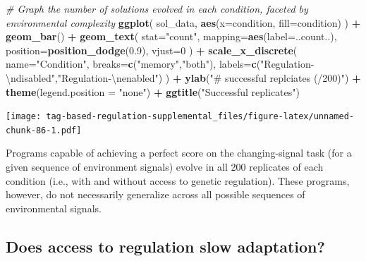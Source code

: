 \documentclass[
]{book}
\newenvironment{Shaded}{\begin{snugshade}}{\end{snugshade}}
\newcommand{\CharTok}[1]{\textcolor[rgb]{0.31,0.60,0.02}{#1}}
\newcommand{\CommentTok}[1]{\textcolor[rgb]{0.56,0.35,0.01}{\textit{#1}}}
\newcommand{\DataTypeTok}[1]{\textcolor[rgb]{0.13,0.29,0.53}{#1}}
\newcommand{\DecValTok}[1]{\textcolor[rgb]{0.00,0.00,0.81}{#1}}
\newcommand{\FloatTok}[1]{\textcolor[rgb]{0.00,0.00,0.81}{#1}}
\newcommand{\KeywordTok}[1]{\textcolor[rgb]{0.13,0.29,0.53}{\textbf{#1}}}
\newcommand{\NormalTok}[1]{#1}
\newcommand{\OperatorTok}[1]{\textcolor[rgb]{0.81,0.36,0.00}{\textbf{#1}}}
\newcommand{\StringTok}[1]{\textcolor[rgb]{0.31,0.60,0.02}{#1}}
\begin{document}
\begin{Shaded}
\begin{Highlighting}[]
\CommentTok{\# Graph the number of solutions evolved in each condition, faceted by environmental complexity}
\KeywordTok{ggplot}\NormalTok{( sol\_data, }\KeywordTok{aes}\NormalTok{(}\DataTypeTok{x=}\NormalTok{condition, }\DataTypeTok{fill=}\NormalTok{condition) ) }\OperatorTok{+}
\StringTok{  }\KeywordTok{geom\_bar}\NormalTok{() }\OperatorTok{+}
\StringTok{  }\KeywordTok{geom\_text}\NormalTok{(}
    \DataTypeTok{stat=}\StringTok{"count"}\NormalTok{,}
    \DataTypeTok{mapping=}\KeywordTok{aes}\NormalTok{(}\DataTypeTok{label=}\NormalTok{..count..),}
    \DataTypeTok{position=}\KeywordTok{position\_dodge}\NormalTok{(}\FloatTok{0.9}\NormalTok{),}
    \DataTypeTok{vjust=}\DecValTok{0}
\NormalTok{  ) }\OperatorTok{+}
\StringTok{  }\KeywordTok{scale\_x\_discrete}\NormalTok{(}
    \DataTypeTok{name=}\StringTok{"Condition"}\NormalTok{,}
    \DataTypeTok{breaks=}\KeywordTok{c}\NormalTok{(}\StringTok{"memory"}\NormalTok{,}\StringTok{"both"}\NormalTok{),}
    \DataTypeTok{labels=}\KeywordTok{c}\NormalTok{(}\StringTok{"Regulation{-}}\CharTok{\textbackslash{}n}\StringTok{disabled"}\NormalTok{,}\StringTok{"Regulation{-}}\CharTok{\textbackslash{}n}\StringTok{enabled"}\NormalTok{)}
\NormalTok{  ) }\OperatorTok{+}
\StringTok{  }\KeywordTok{ylab}\NormalTok{(}\StringTok{"\# successful replciates (/200)"}\NormalTok{) }\OperatorTok{+}
\StringTok{  }\KeywordTok{theme}\NormalTok{(}\DataTypeTok{legend.position =} \StringTok{"none"}\NormalTok{) }\OperatorTok{+}
\StringTok{  }\KeywordTok{ggtitle}\NormalTok{(}\StringTok{"Successful replicates"}\NormalTok{)}
\end{Highlighting}
\end{Shaded}

\texttt{[image: tag-based-regulation-supplemental\_files/figure-latex/unnamed-chunk-86-1.pdf]}

Programs capable of achieving a perfect score on the changing-signal task (for a given sequence of environment signals) evolve in all 200 replicates of each condition (i.e., with and without access to genetic regulation).
These programs, however, do not necessarily generalize across all possible sequences of environmental signals.

\hypertarget{does-access-to-regulation-slow-adaptation}{%
\subsection{Does access to regulation slow adaptation?}\label{does-access-to-regulation-slow-adaptation}}
\end{document}
